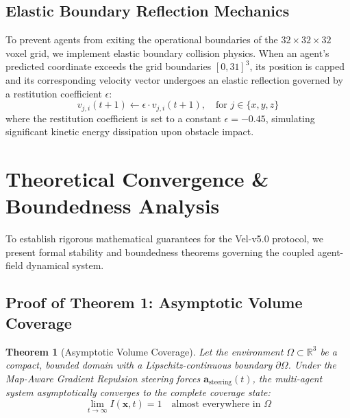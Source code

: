 \documentclass[letterpaper, 10pt, conference]{IEEEtran}
\newtheorem{theorem}{Theorem}
\begin{document}
\subsection{Elastic Boundary Reflection Mechanics}
To prevent agents from exiting the operational boundaries of the $32 \times 32 \times 32$ voxel grid, we implement elastic boundary collision physics. When an agent's predicted coordinate exceeds the grid boundaries $[0, 31]^3$, its position is capped and its corresponding velocity vector undergoes an elastic reflection governed by a restitution coefficient $\epsilon$:
\begin{equation}
    v_{j,i}(t+1) \leftarrow \epsilon \cdot v_{j,i}(t+1), \quad \text{for } j \in \{x, y, z\}
    \label{eq:restitution}
\end{equation}
where the restitution coefficient is set to a constant $\epsilon = -0.45$, simulating significant kinetic energy dissipation upon obstacle impact.

\section{Theoretical Convergence \& Boundedness Analysis}
\label{sec:theory}

To establish rigorous mathematical guarantees for the Vel-v5.0 protocol, we present formal stability and boundedness theorems governing the coupled agent-field dynamical system.

\subsection{Proof of Theorem 1: Asymptotic Volume Coverage}
\begin{theorem}[Asymptotic Volume Coverage]
Let the environment $\Omega \subset \mathbb{R}^3$ be a compact, bounded domain with a Lipschitz-continuous boundary $\partial\Omega$. Under the Map-Aware Gradient Repulsion steering forces $\mathbf{a}_{\text{steering}}(t)$, the multi-agent system asymptotically converges to the complete coverage state:
\begin{equation}
    \lim_{t \to \infty} I(\mathbf{x}, t) = 1 \quad \text{almost everywhere in } \Omega
\end{equation}
\end{theorem}
\end{document}
